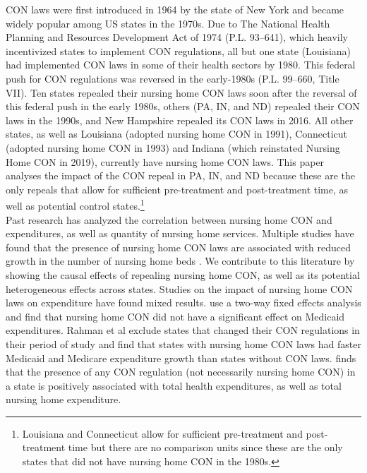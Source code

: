 \documentclass[../Main.tex]{subfiles}
\begin{document}
CON laws were first introduced in 1964 by the state of New York and became widely popular among US states in the 1970s. Due to The National Health Planning and Resources Development Act of 1974 (P.L. 93–641), which heavily incentivized states to implement CON regulations, all but one state (Louisiana) had implemented CON laws in some of their health sectors by 1980. This federal push for CON regulations was reversed in the early-1980s (P.L. 99–660, Title VII). Ten states repealed their nursing home CON laws soon after the reversal of this federal push in the early 1980s, others (PA, IN, and ND) repealed their CON laws in the 1990s, and New Hampshire repealed its CON laws in 2016. All other states, as well as Louisiana (adopted nursing home CON in 1991), Connecticut (adopted nursing home CON in 1993) and Indiana (which reinstated Nursing Home CON in 2019), currently have nursing home CON laws. This paper analyses the impact of the CON repeal in PA, IN, and ND because these are the only repeals that allow for sufficient pre-treatment and post-treatment time, as well as potential control states.\footnote{Louisiana and Connecticut allow for sufficient pre-treatment and post-treatment time but there are no comparison units since these are the only states that did not have nursing home CON in the 1980s.} \\
\indent Past research has analyzed the correlation between nursing home CON and expenditures, as well as quantity of nursing home services. Multiple studies have found that the presence of nursing home CON laws are associated with reduced growth in the number of nursing home beds \citep{harrington1997effect,swan1991certificate,zinn1994market}. We contribute to this literature by showing the causal effects of repealing nursing home CON, as well as its potential heterogeneous effects across states. Studies on the impact of nursing home CON laws on expenditure have found mixed results. \citet{grabowski2003effects} use a two-way fixed effects analysis and find that nursing home CON did not have a significant effect on Medicaid expenditures. Rahman et al \citet{rahman2016impact} exclude states that changed their CON regulations in their period of study and find that states with nursing home CON laws had faster Medicaid and Medicare expenditure growth than states without CON laws. \citet{bailey2019can} finds that the presence of any CON regulation (not necessarily nursing home CON) in a state is positively associated with total health expenditures, as well as total nursing home expenditure.\\
\end{document}
